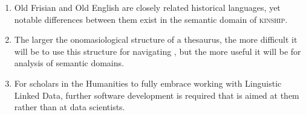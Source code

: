 \documentclass[twoside,openright,11pt]{book}
\begin{document}
\begin{adjustwidth}{-1.25em}{-0.25em}
\begin{enumerate}
\item %
Old Frisian and Old English are closely related historical languages, yet notable differences between them exist in the semantic domain of \textsc{kinship}.



\item The larger the onomasiological structure of a thesaurus, the more difficult it will be to use this structure for navigating%
, but the more useful it will be for analysis of semantic domains.

\item For scholars in the Humanities to fully embrace working with Linguistic Linked Data, further software development is required that is aimed at them rather than at data scientists. 



\end{enumerate}
\end{adjustwidth}
\end{document}
